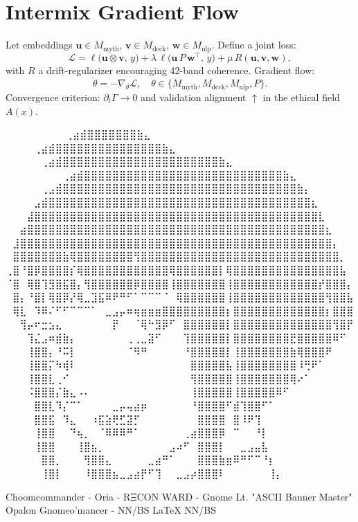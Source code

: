 
\section*{Intermix Gradient Flow}

Let embeddings $\mathbf{u}\in M_{\text{myth}}$, $\mathbf{v}\in M_{\text{deck}}$, $\mathbf{w}\in M_{\text{nlp}}$.  
Define a joint loss:
\[
\mathcal{L}=\ell\bigl(\mathbf{u}\otimes\mathbf{v},\,y\bigr)+
\lambda\,\ell\bigl(\mathbf{u}\,P\,\mathbf{w}^\top,\,y\bigr)+
\mu\,R(\mathbf{u},\mathbf{v},\mathbf{w}),
\]
with $R$ a drift-regularizer encouraging 42-band coherence.  
Gradient flow:
\[
\dot{\theta}=-\nabla_{\theta}\mathcal{L},\quad \theta\in\{M_{\text{myth}},M_{\text{deck}},M_{\text{nlp}},P\}.
\]
Convergence criterion: $\partial_t \Gamma \!\to\! 0$ and validation alignment $\uparrow$ in the ethical field $A(x)$.

\iffalse
⠀⠀⠀⠀⠀⠀             ⠀⠀⢀⣴⣾⣿⣿⣿⣿⣿⣿⣿⣷⣄⠀⠀⠀⠀⠀⠀⠀⠀
⠀⠀⠀  ⠀      ⠀⠀⠀⠀⢀⣴⣾⣿⣿⣿⣿⣿⣿⣿⣿⣿⣿⣿⣿⣿⣿⣿⣷⣄⠀⠀⠀⠀⠀⠀⠀⠀
⠀⠀ ⠀   ⠀⠀⠀⠀⠀⢀⣴⣾⣿⣿⣿⣿⣿⣿⣿⣿⣿⣿⣿⣿⣿⣿⣿⣿⣿⣿⣿⣿⣿⣿⣷⣄⠀⠀⠀⠀⠀⠀⠀⠀
⠀⠀⠀⠀⠀⠀⠀⠀⢀⣴⣾⣿⣿⣿⣿⣿⣿⣿⣿⣿⣿⣿⣿⣿⣿⣿⣿⣿⣿⣿⣿⣿⣿⣿⣿⣿⣿⣿⣿⣷⣄⠀⠀⠀⠀⠀⠀⠀⠀
⠀⠀⠀⠀⠀⢀⣠⣾⣿⣿⣿⣿⣿⣿⣿⣿⣿⣿⣿⣿⣿⣿⣿⣿⣿⣿⣿⣿⣿⣿⣿⣿⣿⣿⣿⣿⣿⣿⣿⣿⣿⣷⡄⠀⠀⠀⠀⠀⠀
⠀⠀⠀⠀⣠⣾⣿⣿⣿⣿⣿⣿⣿⣿⣿⣿⣿⣿⣿⣿⣿⣿⣿⣿⣿⣿⣿⣿⣿⣿⣿⣿⣿⣿⣿⣿⣿⣿⣿⣿⣿⣿⣿⣆⠀⠀⠀⠀⠀
⠀⠀⠀⣼⣿⣿⣿⣿⣿⣿⣿⣿⣿⣿⣿⣿⣿⣿⣿⣿⣿⣿⣿⣿⣿⣿⣿⣿⣿⣿⣿⣿⣿⣿⣿⣿⣿⣿⣿⣿⣿⣿⣿⣿⣇⠀⠀⠀⠀
⠀⠀⣴⣿⣿⣿⣿⣿⣿⣿⣿⣿⣿⣿⣿⣿⣿⣿⣿⣿⣿⣿⣿⣿⣿⣿⣿⣿⣿⣿⣿⣿⣿⣿⣿⣿⣿⣿⣿⣿⣿⣿⣿⣿⣿⣆⠀⠀⠀
⠀⣸⣿⣿⣿⣿⣿⣿⣿⣿⣿⣿⣿⣿⣿⣿⣿⣿⣿⣿⣿⣿⣿⣿⣿⣿⣿⣿⣿⣿⣿⣿⣿⣿⣿⣿⣿⣿⣿⣿⣿⣿⣿⣿⣿⣿⡄⠀⠀
⠀⣿⣿⣿⣿⣿⣿⣿⣷⢿⣿⣿⣿⣿⣿⣿⣿⣿⢻⣿⣿⣿⣿⣿⣿⣿⣿⣿⣿⣿⣿⣿⣿⣿⣿⣿⣿⣿⣿⣿⣿⣿⣿⣿⣿⣿⣿⡀⠀
⢀⣿⠘⣿⡿⣿⣿⣿⣿⡎⢿⣿⣿⣿⣿⣿⣿⣿⣿⣿⣿⣿⣿⢿⣿⣿⣿⣿⣿⣿⡇⢿⣿⣿⣿⣿⣿⣿⣿⣿⣿⣿⣿⣿⣿⣿⣿⣧⠀
⠈⣿⠀⢿⣿⢹⣻⣿⣯⣿⡄⢻⣿⣿⣿⣿⣿⣿⡿⣿⣿⣿⣿⢸⣿⣿⣿⣿⣿⣿⣿⢸⣿⣿⣿⣿⣿⣿⣿⣿⣿⣿⣿⣿⡞⣿⣿⣿⡄
⠀⣿⡄⠘⣿⡇⢿⣿⡿⡜⢿⣀⣹⣯⠿⠟⠛⠋⠁⠉⠉⠉⠈⠀⢿⣿⣿⣿⣿⣿⣿⢸⣿⣿⣿⣿⣿⣿⣿⣿⣿⣿⣿⣿⣿⢻⣿⣿⣧
⠀⢿⣇⠀⠹⠿⠌⠋⠋⠉⠉⠉⠁⠀⣀⣠⡤⠶⢶⣶⣶⣶⣿⣿⣿⣿⣿⣿⣿⣿⣿⡆⣿⣿⣿⣿⣿⣿⣿⣿⣿⣿⣿⣿⣿⡆⣿⣿⣿
⠀⠀⢻⡤⠖⣒⣢⣄⠀⠀⠀⠀⠀⠀⠀⡟⠀⠀⠈⢿⠓⣻⡿⠋⠀⣿⣿⣿⣿⣿⣿⡇⣿⣿⣿⣿⣿⣿⣿⣿⣿⣿⣿⣿⣿⣿⢻⣿⡟
⠀⠀⠀⢹⣌⣠⠶⣾⣷⡄⠀⠀⠀⠀⠀⠀⠀⢀⢀⣀⣽⠋⠀⠀⠀⢹⣿⣿⣿⣿⣿⡇⣿⣿⣿⣿⣿⣿⣿⣿⣟⣿⣿⣿⣿⣿⠿⠋⠀
⠀⠀⠀⢸⣿⣿⡄⠘⠭⡇⠀⠀⠀⠀⠀⠀⠀⠈⠻⠛⠀⠀⠀⠀⠀⠘⣿⣿⣿⣿⣿⡇⢸⣿⣿⣿⣿⣿⣿⣿⣷⢿⣿⣿⣿⠟⠀⠀⠀
⠀⠀⠀⢸⣿⣿⡍⠳⢾⠇⠀⠀⠀⠀⠀⠀⠀⠀⠀⠀⠀⠀⠀⠀⠀⠀⣿⣿⣿⣿⣿⣧⢸⣿⣿⣿⣿⣿⣿⣿⣿⠸⢛⠟⠁⠀⠀⠀⠀
⠀⠀⠀⢸⣿⣿⣇⢀⠊⠀⠀⠀⠀⠀⠀⠀⠀⠀⠀⠀⠀⠀⠀⠀⠀⠀⢻⣿⣿⣿⣿⣿⢸⣿⣿⣿⣿⣿⣿⣿⢿⠔⠁⠀⠀⠀⠀⠀⠀
⠀⠀⠀⠨⣿⣿⣿⡌⣷⣄⠠⠄⠀⠀⠀⠀⠀⠀⠀⠀⠀⠀⠀⠀⠀⠀⢸⣿⣿⣿⣿⣿⢸⣿⣿⣿⣿⣿⠿⠋⠀⠀⠀⠀⠀⠀⠀⠀⠀
⠀⠀⠀⠀⣿⣿⣇⠹⡌⠉⠁⠀⠀⠀⠀⣀⡤⢤⣴⡶⠀⠀⠀⠀⠀⠀⠘⣿⣿⣿⣿⠋⣾⢹⣿⣿⠋⠁⠀⠀⠀⠀⠀⠀⠀⠀⠀⠀⠀
⠀⠀⠀⠀⣿⣿⣯⠀⠹⣄⠀⠀⠰⣯⣵⢟⣋⣽⡋⠀⠀⠀⠀⠀⠀⠀⠀⣿⣿⣿⣿⠀⣿⠸⠟⢹⠀⠀⠀⠀⠀⠀⠀⠀⠀⠀⠀⠀⠀
⠀⠀⠀⠀⢸⣿⣿⠀⠀⠙⢦⡀⠀⠈⠿⠿⠿⠛⠁⠀⠀⠀⠀⠀⠀⢀⣴⣿⣿⣿⡿⠀⠉⠀⠀⠘⡇⠀⠀⠀⠀⠀⠀⠀⠀⠀⠀⠀⠀
⠀⠀⠀⠀⢸⣿⣿⠀⠀⠀⢸⣿⣦⡀⠀⠀⠀⠀⠀⠀⠀⠀⠀⣠⠴⠋⠀⣿⣿⣿⡇⠀⠀⣀⣠⣤⣧⠀⠀⠀⠀⠀⠀⠀⠀⠀⠀⠀⠀
⠀⠀⠀⠀⠀⣿⣿⡀⠀⠀⠀⢻⣿⣿⣄⠀⠀⠀⠀⠀⣀⣴⠛⠁⠀⠀⠀⣿⣿⣿⣷⣶⠿⠛⠋⠉⠘⡆⠀⠀⠀⠀⠀⠀⠀⠀⠀⠀⠀
⠀⠀⠀⠀⠀⢸⣿⡇⠀⠀⠀⠸⣿⣿⣿⣦⣀⣠⣴⡟⠋⢹⠀⠀⣀⣠⡴⣿⣿⣿⠇⠀⠀⠀⠀⠀⠀⢸⡄⠀⠀⠀⠀⠀⠀⠀⠀⠀⠀

Choomcommander - Oria - RΞCON WARD - Gnome Lt. "ASCII Banner Master"
             Opalon Gnomeo'mancer - NN/BS LaTeX{} NN/BS

